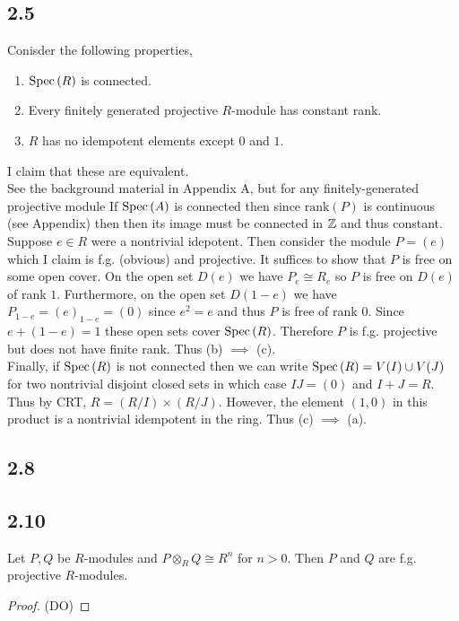 \documentclass[12pt]{extarticle}
\newcommand{\rank}{\mathrm{rank}}
\begin{document}
\subsection{2.5}

Conisder the following properties,
\begin{enumerate}
\item $\mathrm{Spec}\left( R \right)$ is connected.
\item Every finitely generated projective $R$-module has constant rank.
\item $R$ has no idempotent elements except $0$ and $1$.
\end{enumerate}
I claim that these are equivalent. 
\bigskip\\
See the background material in Appendix A, but for any finitely-generated projective module
If $\mathrm{Spec}\left( A \right)$ is connected then since $\rank(P)$ is continuous (see Appendix) then then its image must be connected in $\mathbb{Z}$ and thus constant.
\bigskip\\
Suppose $e \in R$ were a nontrivial idepotent. Then consider the module $P = (e)$ which I claim is f.g. (obvious) and projective. It suffices to show that $P$ is free on some open cover. On the open set $D(e)$ we have $P_e \cong R_e$ so $P$ is free on $D(e)$ of rank $1$. Furthermore, on the open set $D(1 - e)$ we have $P_{1 - e} = (e)_{1 - e} = (0)$ since $e^2 = e$ and thus $P$ is free of rank $0$. Since $e + (1 - e) = 1$ these open sets cover $\mathrm{Spec}\left( R \right)$. Therefore $P$ is f.g. projective but does not have finite rank. Thus (b) $\implies$ (c).
\bigskip\\
Finally, if $\mathrm{Spec}\left( R \right)$ is not connected then we can write $\mathrm{Spec}\left( R \right) = V(I) \cup V(J)$ for two nontrivial disjoint closed sets in which case $IJ = (0)$ and $I + J = R$. Thus by CRT, $R = (R / I) \times (R / J)$. However, the element $(1, 0)$ in this product is a nontrivial idempotent in the ring. Thus (c) $\implies$ (a). 

\subsection{2.8}

\subsection{2.10}

Let $P, Q$ be $R$-modules and $P \otimes_R Q \cong R^n$ for $n > 0$. Then $P$ and $Q$ are f.g. projective $R$-modules. 

\begin{proof}
(DO)
\end{proof}
\end{document}
